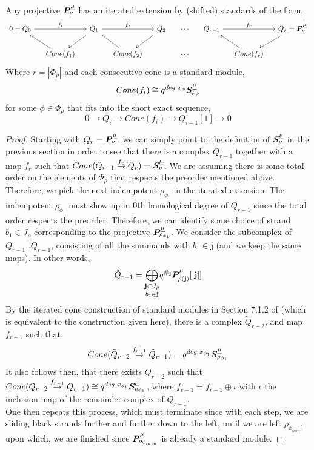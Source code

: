 \documentclass{article}
\begin{document}
\begin{prop}\label{prop:it.ext.proj}
    Any projective ${\boldsymbol{P}}^{\underline{\mu}}_{\rho}$ has an iterated extension by (shifted) standards of the form, 
    \[
    \begin{tikzcd}[column sep =small]
        0=Q_0 \ar[rr,"f_1"] && Q_1 \ar[rr,"f_2"] && Q_2 & \cdots & Q_{r-1} \ar[rr,"f_r"] && Q_r = \Pb^{\underline{\mu}}_{\rho} \\
        &Cone(f_1)\ar[ru,leftarrow] \ar[lu]&&Cone(f_2)\ar[ru,leftarrow] \ar[lu]&&\cdots && Cone(f_r)\ar[ru,leftarrow] \ar[lu]
    \end{tikzcd}
    \]
Where $r = |\Phi_\rho|$ and each consecutive cone is a standard module, 
$$Cone(f_i) \cong q^{deg \hspace{1mm}x_\phi}{\boldsymbol{S}}^{\underline{\mu}}_{\rho_\phi}$$
for some $\phi \in \Phi_\rho$ that fits into the short exact sequence,
$$0\rightarrow Q_i\rightarrow Cone(f_i) \rightarrow Q_{i-1}[1] \rightarrow 0$$
\end{prop}
\begin{proof}
Starting with $Q_r = {\boldsymbol{P}}^{\underline{\mu}}_\rho$, we can simply point to the definition of ${\boldsymbol{S}}^{\underline{\mu}}_\rho$ in the previous section in order to see that there is a complex $Q_{r-1}$ together with a map $f_r$ such that $Cone(Q_{r-1}\overset{f_r}{\rightarrow} Q_r) = {\boldsymbol{S}}^{\underline{\mu}}_\rho$. We are assuming there is some total order on the elements of $\Phi_\rho$ that respects the preorder mentioned above. Therefore, we pick the next indempotent $\rho_{\phi_1}$ in the iterated extension. The indempotent $\rho_{\phi_1}$ must show up in $0$th homological degree of $Q_{r-1}$ since the total order respects the preorder. Therefore, we can identify some choice of strand $b_1 \in J_\rho$ corresponding to the projective ${\boldsymbol{P}}_{\rho_{\phi_1}}^{\underline{\mu}}$. We consider the subcomplex of $Q_{r-1}$, $\tilde{Q}_{r-1}$, consisting of all the summands with $b_1 \in \mathbf{j}$ (and we keep the same maps). In other words, 
$$\tilde{Q}_{r-1} =\underset{b_1\in \mathbf{j}}{\bigoplus_{\mathbf{j}\subset J_\rho} }q^{\#_{\mathbf{j}}}{\boldsymbol{P}}^{\underline{\mu}}_{\rho(\mathbf{j})} [|\mathbf{j}|] $$
By the iterated cone construction of standard modules in Section 7.1.2 of \cite{Na} (which is equivalent to the construction given here), there is a complex $\tilde{Q}_{r-2}$, and map $\tilde{f}_{r-1}$ such that, 
$$Cone(\tilde{Q}_{r-2} \overset{\tilde{f}_{r-1}}{\rightarrow} \tilde{Q}_{r-1}) = q^{deg\hspace{1mm} x_{\phi_1}}{\boldsymbol{S}}_{\rho_{\phi_1}}^{\underline{\mu}}$$
It also follows then, that there exists $Q_{r-2}$ such that $Cone(Q_{r-2} \overset{f_{r-1}}{\rightarrow} Q_{r-1}) \cong q^{deg\hspace{1mm} x_{\phi_1}}{\boldsymbol{S}}_{\rho_{\phi_1}}^{\underline{\mu}}$, where $f_{r-1} = \tilde{f}_{r-1} \oplus \iota$ with $\iota$ the inclusion map of the remainder complex of $Q_{r-1}$.\\
One then repeats this process, which must terminate since with each step, we are sliding black strands further and further down to the left, until we are left $\rho_{\phi_{min}}$, upon which, we are finished since ${\boldsymbol{P}}^{\underline{\mu}}_{\rho_{\phi_{min}}}$ is already a standard module. 
\end{proof}
\end{document}
